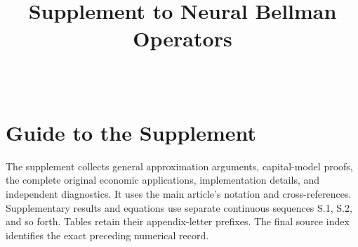\documentclass[ecta,nameyear,draft]{econsocart}
\theoremstyle{definition}
\theoremstyle{remark}
\begin{document}
\begin{frontmatter}
\title{Supplement to Neural Bellman Operators}
\begin{aug}
\author[id=au1,addressref={add1}]{~}
\address[id=add1]{Peking University}
\end{aug}
\end{frontmatter}
\section*{Guide to the Supplement}
The supplement collects general approximation arguments, capital-model proofs,
the complete original economic applications, implementation details, and
independent diagnostics. It uses the main article's notation and cross-references.
Supplementary results and equations use separate continuous sequences
S.1, S.2, and so forth. Tables retain their appendix-letter prefixes.
The final source index identifies the exact preceding numerical record.
\begin{appendix}

























\end{appendix}


\end{document}
